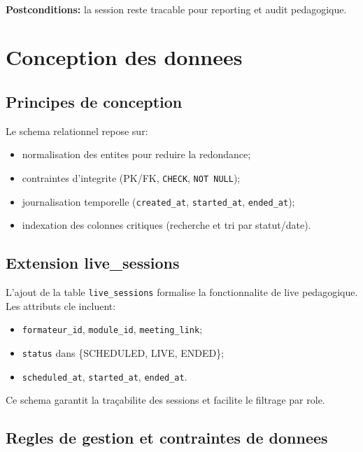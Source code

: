 ﻿﻿\documentclass[12pt,a4paper,oneside]{report}
\begin{document}
\textbf{Postconditions:} la session reste tracable pour reporting et audit pedagogique.

\section{Conception des donnees}

\subsection{Principes de conception}

Le schema relationnel repose sur:
\begin{itemize}
  \item normalisation des entites pour reduire la redondance;
  \item contraintes d'integrite (PK/FK, \texttt{CHECK}, \texttt{NOT NULL});
  \item journalisation temporelle (\texttt{created\_at}, \texttt{started\_at}, \texttt{ended\_at});
  \item indexation des colonnes critiques (recherche et tri par statut/date).
\end{itemize}

\subsection{Extension live\_sessions}

L'ajout de la table \texttt{live\_sessions} formalise la fonctionnalite de live pedagogique.
Les attributs cle incluent:
\begin{itemize}
  \item \texttt{formateur\_id}, \texttt{module\_id}, \texttt{meeting\_link};
  \item \texttt{status} dans \{SCHEDULED, LIVE, ENDED\};
  \item \texttt{scheduled\_at}, \texttt{started\_at}, \texttt{ended\_at}.
\end{itemize}

Ce schema garantit la traçabilite des sessions et facilite le filtrage par role.

\subsection{Regles de gestion et contraintes de donnees}
\end{document}
